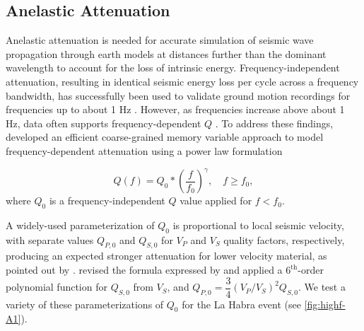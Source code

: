 \subsection{Anelastic Attenuation}
Anelastic attenuation is needed for accurate simulation of seismic wave propagation through earth models at distances further than the dominant wavelength to account for the loss of intrinsic energy. Frequency-independent attenuation, resulting in identical seismic energy loss per cycle across a frequency bandwidth, has successfully been used to validate ground motion recordings for frequencies up to about 1 Hz . However, as frequencies increase above about 1 Hz, data often supports frequency-dependent $Q$ . To address these findings, \citet{withersMemoryEfficientSimulation2015} developed an efficient coarse-grained memory variable approach to model frequency-dependent attenuation using a power law formulation

\begin{equation}\label{eq:highf-3}
  Q(f)=Q_{0} *\left(\dfrac{f}{f_{0}}\right)^{\gamma}, \quad f \geq f_{0},
\end{equation}
\noindent where $Q_0$ is a frequency-independent $Q$ value applied for $f<f_{0}$.  %

A widely-used parameterization of $Q_0$ is proportional to local seismic velocity, with separate values $Q_{P,0}$ and $Q_{S,0}$ for $V_P$ and $V_S$ quality factors, respectively, producing an expected stronger attenuation for lower velocity material, as pointed out by \citet{haukssonAttenuationModelsThree2006}. \citet{taborda2014ground} revised the formula expressed by \citet{brocher2008compressional} and applied a $6^{\text{th}}$-order polynomial function for $Q_{S,0}$ from $V_S$, and $Q_{P,0}=\dfrac{3}{4}\left(V_P/V_S\right)^2Q_{S,0}$. We test a variety of these parameterizations of $Q_0$ for the La Habra event (see \cref{fig:highf-A1}).

